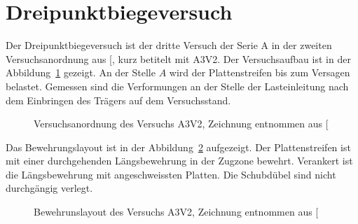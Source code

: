 \documentclass[
  11pt,
  letterpaper,
]{scrreprt}
\begin{document}
\section{Dreipunktbiegeversuch}\label{dreipunktbiegeversuch}

Der Dreipunktbiegeversuch ist der dritte Versuch der Serie A in der
zweiten Versuchsanordnung aus
{[}\citeproc{ref-jager_versuche_2006}{2}{]}, kurz betitelt mit A3V2. Der
Versuchsaufbau ist in der Abbildung~\ref{fig-anordnung_a3v2} gezeigt. An
der Stelle \(A\) wird der Plattenstreifen bis zum Versagen belastet.
Gemessen sind die Verformungen an der Stelle der Lasteinleitung nach dem
Einbringen des Trägers auf dem Versuchsstand.

\begin{figure}[H]


\caption{\label{fig-anordnung_a3v2}Versuchsanordnung des Versuchs A3V2,
Zeichnung entnommen aus {[}\citeproc{ref-jager_versuche_2006}{2}{]}}

\end{figure}%

Das Bewehrungslayout ist in der Abbildung~\ref{fig-bewehrung_a3v2}
aufgezeigt. Der Plattenstreifen ist mit einer durchgehenden
Längsbewehrung in der Zugzone bewehrt. Verankert ist die Längsbewehrung
mit angeschweissten Platten. Die Schubdübel sind nicht durchgängig
verlegt.

\begin{figure}[H]


\caption{\label{fig-bewehrung_a3v2}Bewehrunslayout des Versuchs A3V2,
Zeichnung entnommen aus {[}\citeproc{ref-jager_versuche_2006}{2}{]}}

\end{figure}%
\end{document}
